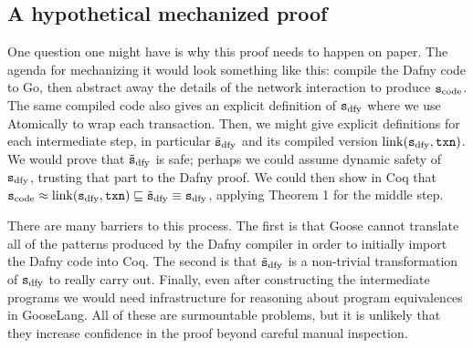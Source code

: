 \subsection{A hypothetical mechanized proof}

One question one might have is why this proof needs to happen on paper. The
agenda for mechanizing it would look something like this: compile the Dafny code
to Go, then abstract away the details of the network interaction to produce
$\texttt{s}_{\mathrm{code}}$. The same compiled code also gives an explicit
definition of $\texttt{s}_{\mathrm{dfy}}$ where we use Atomically to wrap each transaction. Then, we
might give explicit definitions for each intermediate step, in particular
$\tilde{\texttt{s}}_{\mathrm{dfy}}$ and its compiled version $\mathrm{link}(\texttt{s}_{\mathrm{dfy}}, \texttt{txn})$. We would prove that
$\tilde{\texttt{s}}_{\mathrm{dfy}}$ is safe; perhaps we could assume dynamic safety of $\texttt{s}_{\mathrm{dfy}}$, trusting
that part to the Dafny proof. We could then show in Coq that
$\texttt{s}_{\mathrm{code}} \approx \mathrm{link}(\texttt{s}_{\mathrm{dfy}}, \texttt{txn}) \sqsubseteq \tilde{\texttt{s}}_{\mathrm{dfy}} \equiv \texttt{s}_{\mathrm{dfy}}$,
applying Theorem 1 for the middle step.

There are many barriers to this process. The first is that Goose cannot
translate all of the patterns produced by the Dafny compiler in order to
initially import the Dafny code into Coq. The second is that $\tilde{\texttt{s}}_{\mathrm{dfy}}$ is a
non-trivial transformation of $\texttt{s}_{\mathrm{dfy}}$ to really carry out. Finally, even after
constructing the intermediate programs we would need infrastructure for
reasoning about program equivalences in GooseLang. All of these are surmountable
problems, but it is unlikely that they increase confidence in the proof beyond
careful manual inspection.
